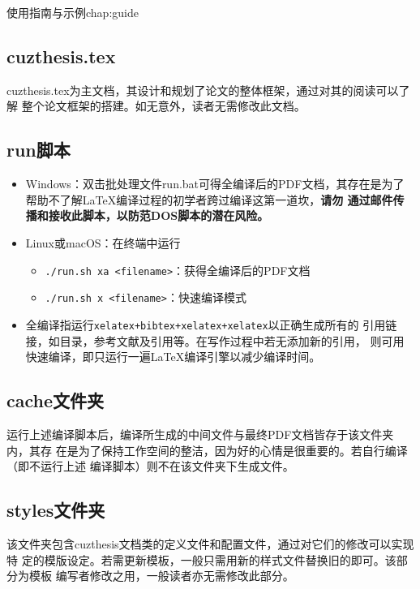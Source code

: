\begin{cuzchapter}{使用指南与示例}{chap:guide}
	\subsection{cuzthesis.tex}\label{sub:cuzthesis}

	cuzthesis.tex为主文档，其设计和规划了论文的整体框架，通过对其的阅读可以了解
	整个论文框架的搭建。如无意外，读者无需修改此文档。

	\subsection{run脚本}\label{sub:scripts}

	\begin{itemize}
		\item Windows：双击批处理文件run.bat可得全编译后的PDF文档，其存在是为了
		      帮助不了解\LaTeX{}编译过程的初学者跨过编译这第一道坎，\textbf{请勿
			      通过邮件传播和接收此脚本，以防范DOS脚本的潜在风险。}
		\item Linux或macOS：在终端中运行
		      \begin{itemize}
			      \item \verb|./run.sh xa <filename>|：获得全编译后的PDF文档
			      \item \verb|./run.sh x <filename>|：快速编译模式
		      \end{itemize}
		\item 全编译指运行\verb|xelatex+bibtex+xelatex+xelatex|以正确生成所有的
		      引用链接，如目录，参考文献及引用等。在写作过程中若无添加新的引用，
		      则可用快速编译，即只运行一遍\LaTeX{}编译引擎以减少编译时间。
	\end{itemize}

	\subsection{cache文件夹}\label{sub:cache}

	运行上述编译脚本后，编译所生成的中间文件与最终PDF文档皆存于该文件夹内，其存
	在是为了保持工作空间的整洁，因为好的心情是很重要的。若自行编译（即不运行上述
	编译脚本）则不在该文件夹下生成文件。

	\subsection{styles文件夹}\label{sub:styles}

	该文件夹包含cuzthesis文档类的定义文件和配置文件，通过对它们的修改可以实现特
	定的模版设定。若需更新模板，一般只需用新的样式文件替换旧的即可。该部分为模板
	编写者修改之用，一般读者亦无需修改此部分。


\end{cuzchapter}
